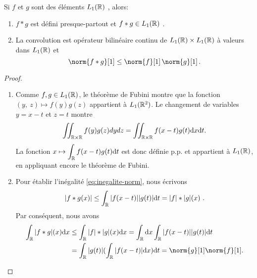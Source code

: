 \begin{proposition}
\label{prop:20.2.1}
Si $f$ et $g$ sont des \'el\'ements $L_1(\mathbb{R})$ , alors:
\begin{enumerate}[label=(\roman*)]
\item $f*g$ est d\'efini presque-partout et $f*g \in L_1(\mathbb{R})$ .
\item La convolution est op\'erateur bilin\'eaire continu de $L_1(\mathbb{R})\times L_1(\mathbb{R})$ \`a valeurs dans $L_1(\mathbb{R})$ et
\begin{equation}
\label{eq:inegalite-norm}
\norm{f*g}[1] \leq \norm{f}[1] \, \norm{ g}[1] \, .
\end{equation}
\end{enumerate}
\end{proposition}
\begin{proof}
 \begin{enumerate}[label=(\roman*), wide=0pt, labelindent=\parindent]
\item Comme $f, g \in L_1(\mathbb{R})$, le th\'eor\`eme de Fubini montre que la fonction $(y,\ z)\mapsto f(y)g(z)$ appartient \`a $L_{1}(\mathbb{R}^{2})$. Le changement de variables $y=x-t$ et $z=t$ montre
$$
\iint_{\mathbb{R}\times \mathbb{R}}f(y)g(z)dydz=\iint_{\mathbb{R}\times \mathbb{R}}f(x-t)g(t)\mathrm{d} x\mathrm{d} t.
$$
La fonction $x\displaystyle \mapsto\int_{\mathbb{R}}f(x-t)g(t)\mathrm{d} t$ est donc d\'efinie p.p. et appartient \`a  $L_1(\mathbb{R})$, en appliquant encore le th\'eor\`eme de Fubini.
\item Pour \'etablir l'in\'egalit\'e \eqref{eq:inegalite-norm}, nous \'ecrivons
$$
|f*g(x)|\leq\int_{\mathbb{R}}|f(x-t)||g(t)|\mathrm{d} t=|f|*|g|(x)\ .
$$
Par cons\'equent, nous avons
\begin{align*}
\int_{\rset}|f*g|(x)\rmd x
&\leq\int_{\rset}|f|*|g|(x)\rmd x=\int_{\rset}\rmd x\int_{\rset}|f(x-t)||g(t)|\rmd t \\
&=\int_{\rset}|g(t)|(\int_{\rset}|f(x-t)|\rmd x)\rmd t= \norm{g}[1] \norm{f}[1].
\end{align*}
\end{enumerate}
\end{proof}


